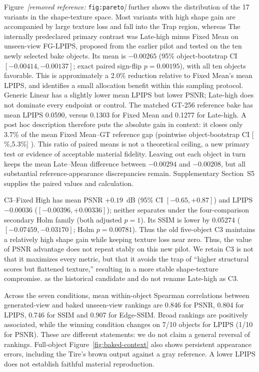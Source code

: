 \documentclass[times,twocolumn,final]{elsarticle}
\providecommand{\DIFadd}[1]{{\protect\color{blue} \sf #1}} %
\providecommand{\DIFdel}[1]{{\protect\color{red} \scriptsize #1}} %
\providecommand{\DIFaddbegin}{} %
\providecommand{\DIFaddend}{} %
\providecommand{\DIFdelbegin}{} %
\providecommand{\DIFdelend}{} %
\providecommand{\DIFaddFL}[1]{\DIFadd{#1}} %
\providecommand{\DIFaddbeginFL}{} %
\providecommand{\DIFdelendFL}{} %
\begin{document}
\DIFdelbegin \DIFdel{Figure~\textit{[removed reference: }\texttt{fig:pareto}\textit{]} further shows the distribution of the 17 variants in the shape-texture space. Most variants with high shape gain are accompanied by large texture loss and fall into the Trap region, whereas }\DIFdelend \DIFaddbegin \DIFadd{The internally predeclared primary contrast was Late-high minus Fixed Mean on unseen-view FG-LPIPS, proposed from the earlier pilot and tested on the ten newly selected bake objects. Its mean is $-0.00265$ (95\% object-bootstrap CI $[-0.00414,-0.00137]$; exact paired sign-flip $p=0.00195$), with all ten objects favorable. This is approximately a 2.0\% reduction relative to Fixed Mean's mean LPIPS, and identifies a small allocation benefit within this sampling protocol. Generic Linear has a slightly lower mean LPIPS but lower PSNR; Late-high does not dominate every endpoint or control. The matched GT-256 reference bake has mean LPIPS 0.0590, versus 0.1303 for Fixed Mean and 0.1277 for Late-high. A post hoc description therefore puts the absolute gain in context: it closes only 3.7\% of the mean Fixed Mean--GT reference gap (pointwise object-bootstrap CI }[\DIFadd{2.3\%,5.3\%}]\DIFadd{). This ratio of paired means is not a theoretical ceiling, a new primary test or evidence of acceptable material fidelity. Leaving out each object in turn keeps the mean Late--Mean difference between $-0.00294$ and $-0.00208$, but all substantial reference-appearance discrepancies remain. Supplementary Section~S5 supplies the paired values and calculation.
}

\DIFadd{C3--Fixed High has mean PSNR $+0.19$~dB (95\% CI $[-0.65,+0.87]$) and LPIPS $-0.00036$ ($[-0.00396,+0.00336]$); neither separates under the four-comparison secondary Holm family (both adjusted $p=1$). Its SSIM is lower by 0.05274 ($[-0.07459,-0.03170]$; Holm $p=0.00781$). Thus the old five-object }\DIFaddend C3 \DIFdelbegin \DIFdel{maintains a relatively high shape gain while keeping texture loss near zero. Thus, the value of }\DIFdelend \DIFaddbegin \DIFadd{PSNR advantage does not repeat stably on this new pilot. We retain }\DIFaddend C3 \DIFdelbegin \DIFdel{is not that it maximizes every metric, but that it avoids the trap of ``higher structural scores but flattened texture,'' resulting in a more stable shape-texture compromise. }\DIFdelend \DIFaddbegin \DIFadd{as the historical candidate and do not rename Late-high as C3.
}\DIFaddend 

\DIFdelbegin %
\DIFdelendFL \DIFaddbeginFL \DIFaddFL{Across the seven conditions, mean within-object Spearman correlations between generated-view and baked unseen-view rankings are 0.846 for PSNR, 0.804 for LPIPS, 0.746 for SSIM and 0.907 for Edge-SSIM. Broad rankings are positively associated, while the winning condition changes on 7/10 objects for LPIPS (1/10 for PSNR). These are different statements: we do not claim a general reversal of rankings. Full-object Figure~\ref{fig:baked-context} also shows persistent appearance errors, including the Tire's brown output against a gray reference. A lower LPIPS does not establish faithful material reproduction.
}
\end{document}
